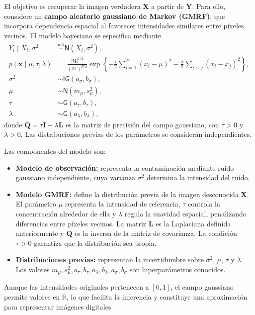 \documentclass[11pt,a4paper]{article}
\begin{document}
El objetivo es recuperar la imagen verdadera $\boldsymbol{X}$ a partir de $\boldsymbol{Y}$. Para ello, considere un \textbf{campo aleatorio gaussiano de Markov (GMRF)}, que incorpora dependencia espacial al favorecer intensidades similares entre píxeles vecinos. El modelo bayesiano se especifica mediante
\begin{align*}
Y_i \mid X_i, \sigma^2 &\overset{\text{ind}}{\sim} \textsf{N}(X_i, \sigma^2), \\[6pt]
p(\boldsymbol{x} \mid \mu, \tau, \lambda) &= \frac{|\mathbf{Q}|^{1/2}}{(2\pi)^{P/2}} \exp\left\{ -\frac{\tau}{2} \sum_{i=1}^{P} (x_i - \mu)^2 - \frac{\lambda}{2} \sum_{i \sim j} (x_i - x_j)^2 \right\}, \\[6pt]
\sigma^2 &\sim \textsf{IG}(a_\sigma, b_\sigma), \\
\mu &\sim \textsf{N}(m_\mu, s_\mu^2), \\
\tau &\sim \textsf{G}(a_\tau, b_\tau), \\
\lambda &\sim \textsf{G}(a_\lambda, b_\lambda),
\end{align*}
donde $\mathbf{Q} = \tau\mathbf{I} + \lambda\mathbf{L}$ es la matriz de precisión del campo gaussiano, con $\tau > 0$ y $\lambda > 0$. Las distribuciones previas de los parámetros se consideran independientes.

Las componentes del modelo son:
\begin{itemize}
    \item \textbf{Modelo de observación:} representa la contaminación mediante ruido gaussiano independiente, cuya varianza $\sigma^2$ determina la intensidad del ruido.
    \item \textbf{Modelo GMRF:} define la distribución previa de la imagen desconocida $\boldsymbol{X}$. El parámetro $\mu$ representa la intensidad de referencia, $\tau$ controla la concentración alrededor de ella y $\lambda$ regula la suavidad espacial, penalizando diferencias entre píxeles vecinos. La matriz $\mathbf{L}$ es la Laplaciana definida anteriormente y $\mathbf{Q}$ es la inversa de la matriz de covarianza. La condición $\tau > 0$ garantiza que la distribución sea propia.
    \item \textbf{Distribuciones previas:} representan la incertidumbre sobre $\sigma^2$, $\mu$, $\tau$ y $\lambda$. Los valores $m_\mu, s_\mu^2, a_\tau, b_\tau, a_\lambda, b_\lambda, a_\sigma, b_\sigma$ son hiperparámetros conocidos.
\end{itemize}

Aunque las intensidades originales pertenecen a $[0, 1]$, el campo gaussiano permite valores en $\mathbb{R}$, lo que facilita la inferencia y constituye una aproximación para representar imágenes digitales.
\end{document}
